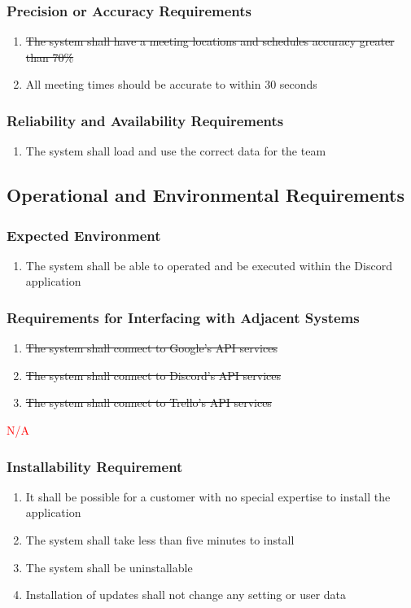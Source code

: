 \documentclass[12pt, titlepage]{article}
\begin{document}
\subsubsection{Precision or Accuracy Requirements}
\begin{enumerate}[start=2, label={P\arabic*.}]
    \item \sout{The system shall have a meeting locations and schedules accuracy greater than 70\%}
    \item All meeting times should be accurate to within 30 seconds
\end{enumerate}
\subsubsection{Reliability and Availability Requirements}
\begin{enumerate}[start=4, label={P\arabic*.}]
    \item The system shall load and use the correct data for the team
\end{enumerate}

\subsection{Operational and Environmental Requirements}
\subsubsection{Expected Environment}
\begin{enumerate}[start=1, label={OE\arabic*.}]
    \item The system shall be able to operated and be executed within the Discord application
\end{enumerate}
\subsubsection{Requirements for Interfacing with Adjacent Systems}
\begin{enumerate}[start=2, label={OE\arabic*.}]
    \item \sout{The system shall connect to Google's API services}
    \item \sout{The system shall connect to Discord's API services}
    \item \sout{The system shall connect to Trello's API services}
\end{enumerate}
\textcolor{red}{N/A}

\subsubsection{Installability Requirement}
\begin{enumerate}[start=5, label={OE\arabic*.}]
    \item It shall be possible for a customer with no special expertise to install the application
    \item The system shall take less than five minutes to install
    \item The system shall be uninstallable
    \item Installation of updates shall not change any setting or user data
\end{enumerate}
\end{document}
